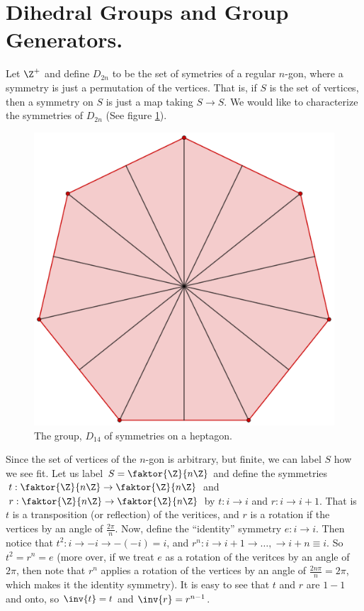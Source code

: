 
\section{Dihedral Groups and Group Generators.}
\label{section1}

Let $\Z^+$ and define $D_{2n}$ to be the set of symetries of a regular $n$-gon,
where a symmetry is just a permutation of the vertices. That is, if  $S$ is the
set of vertices, then a symmetry on  $S$ is just a map taking $S \rightarrow S$.
We would like to characterize the symmetries of $D_{2n}$ (See figure
\ref{fig_1.1}).

\begin{figure}
    \centering
    \includegraphics[scale=0.2]{Figures/chapter1/D_14_symm.eps}
    \caption{The group, $D_{14}$ of symmetries on a heptagon.}
    \label{fig_1.1}
\end{figure}

Since the set of vertices of the $n$-gon is arbitrary, but finite, we can label
$S$ how we see fit. Let us label  $S = \faktor{\Z}{n\Z}$ and define the
symmetries $t:\faktor{\Z}{n\Z} \rightarrow \faktor{\Z}{n\Z}$ and $r:\faktor{\Z}{n\Z}
\rightarrow \faktor{\Z}{n\Z}$ by $t:i \rightarrow i$ and $r:i \rightarrow i+1$.
That is $t$ is a transposition  (or reflection) of the veritices, and $r$ is a rotation
if the vertices by an angle of  $\frac{2\pi}{n}$. Now, define the ``identity''
symmetry $e:i \rightarrow i$. Then notice that $t^2:i \rightarrow -i \rightarrow
-(-i)=i$, and $r^n:i \rightarrow i+1 \rightarrow \dots, \rightarrow i+n \equiv
i$. So $t^2=r^n=e$  (more over, if we treat $e$ as a rotation of the veritces by
an angle of  $2\pi$, then note that $r^n$ applies a rotation of the vertices by
an angle of  $\frac{2n\pi}{n}=2\pi$, which makes it the identity symmetry). It
is easy to see that $t$ and  $r$ are  $1-1$ and onto, so  $\inv{t}=t$ and
$\inv{r}=r^{n-1}$.

